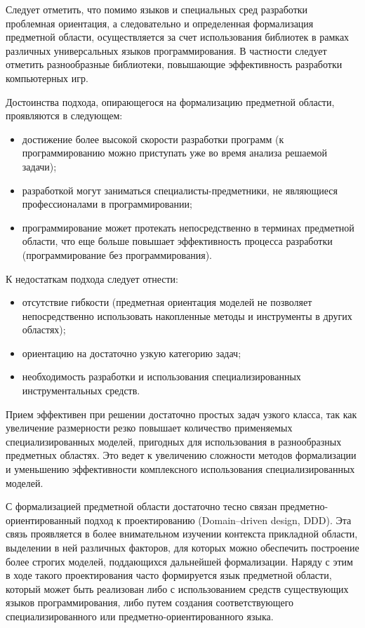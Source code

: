 Следует отметить, что помимо языков и специальных сред разработки проблемная ориентация, а следовательно и определенная формализация предметной области, осуществляется за счет использования библиотек в рамках различных универсальных языков программирования. В частности следует отметить разнообразные библиотеки, повышающие эффективность разработки компьютерных игр.

Достоинства подхода, опирающегося на формализацию предметной области, проявляются в следующем:

\begin{itemize}
    \item достижение более высокой скорости разработки программ (к программированию можно приступать уже во время анализа решаемой задачи);
    \item разработкой могут заниматься специалисты-предметники, не являющиеся профессионалами в программировании;
    \item программирование может протекать непосредственно в терминах предметной области, что еще больше повышает эффективность процесса разработки (программирование без программирования).
\end{itemize}


К недостаткам подхода следует отнести:

\begin{itemize}
    \item отсутствие гибкости (предметная ориентация моделей не позволяет непосредственно использовать накопленные методы и инструменты в других областях);
    \item ориентацию на достаточно узкую категорию задач;
    \item необходимость разработки и использования специализированных инструментальных средств.
\end{itemize}

Прием эффективен при решении достаточно простых задач узкого класса, так как увеличение размерности резко повышает количество применяемых специализированных моделей, пригодных для использования в разнообразных предметных областях. Это ведет к увеличению сложности методов формализации и уменьшению эффективности комплексного использования специализированных моделей.

С формализацией предметной области достаточно тесно связан предметно-ориентированный подход к проектированию (Domain--driven design, DDD). Эта связь проявляется в более внимательном изучении контекста прикладной области, выделении в ней различных факторов, для которых можно обеспечить построение более строгих моделей, поддающихся дальнейшей формализации. Наряду с этим в ходе такого проектирования часто формируется язык предметной области, который может быть реализован либо с использованием средств существующих языков программирования, либо путем создания соответствующего специализированного или предметно-ориентированного языка.

